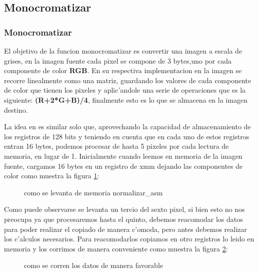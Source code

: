 \subsection{Monocromatizar}
\subsubsection{Monocromatizar  }
El objetivo de la funcion monocromatizar es convertir una imagen a escala de grises, en la imagen fuente
cada pixel se compone de 3 bytes,uno por cada componente de color \textbf{RGB}. En su respectiva implementacion en 
\C la imagen se recorre linealmente como una matriz, guardando los valores de cada componente de color
que tienen los pixeles y aplic'andole una serie de operaciones que es la siguiente:
\textbf{(R+2*G+B)/4}, finalmente esto es lo que se almacena en la imagen destino.

La idea en \ass es similar solo que, aprovechando la capacidad de almacenamiento de los registros de 128 bits
y teniendo en cuenta que en cada uno de estos registros entran 16 bytes, podemos procesar de hasta 5 pixeles
por cada lectura de memoria, en lugar de 1. Inicialmente cuando leemos en memoria de la imagen fuente, cargamos 16 bytes en un registro de xmm dejando 
las componentes de color como muestra la figura \ref{est:m-uno}:

\begin{figure}[hb]
\caption{como se levanta de memoria normalizar\_asm}
\label{est:m-uno}
\end{figure}
Como puede observarse se levanta un tercio del sexto pixel, si bien esto no nos preocupa ya que procesaremos
hasta el quinto, debemos reacomodar los datos para poder realizar el copiado de manera c'omoda, pero
antes debemos realizar los c'alculos necesarios. Para reacomodarlos  copiamos en otro registros
lo leido en memoria y los corrimos de manera conveniente como muestra la figura \ref{est:m-dos}: 
\begin{figure}[hb]
\caption{como se corren los datos de manera favorable}
\label{est:m-dos}
\end{figure}

